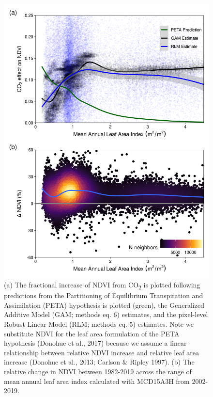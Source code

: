 \documentclass[gc, manuscript]{copernicus}
\begin{document}
\clearpage
\begin{figure}
\includegraphics[width=12cm]{../../figures/appendix-A/SM_Fig9_NDVI-CO2-effect-preds-xLAI_dNDVIxLAI} \caption{(a) The fractional increase of NDVI from CO\textsubscript{2} is plotted following predictions from the Partitioning of Equilibrium Transpiration and Assimilation (PETA) hypothesis is plotted (green), the Generalized Additive Model (GAM; methods eq. 6) estimates, and the pixel-level Robust Linear Model (RLM; methods eq. 5) estimates. Note we substitute NDVI for the leaf area formulation of the PETA hypothesis (Donohue et al., 2017) because we assume a linear relationship between relative NDVI increase and relative leaf area increase (Donohue et al., 2013; Carlson \& Ripley 1997). (b) The relative change in NDVI between 1982-2019 across the range of mean annual leaf area index calculated with MCD15A3H from 2002-2019.}\label{fig:FigA9}
\end{figure}
\clearpage
\end{document}
